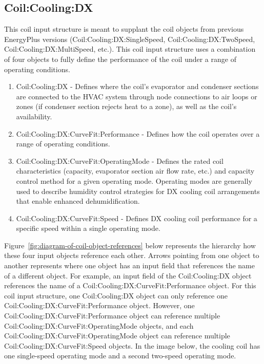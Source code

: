 \subsection{Coil:Cooling:DX}\label{coilcoolingdx}

This coil input structure is meant to supplant the coil objects from previous EnergyPlus versions (Coil:Cooling:DX:SingleSpeed, Coil:Cooling:DX:TwoSpeed, Coil:Cooling:DX:MultiSpeed, etc.). This coil input structure uses a combination of four objects to fully define the performance of the coil under a range of operating conditions.

\begin{enumerate}
\def\labelenumi{\arabic{enumi}.}
\item Coil:Cooling:DX - Defines where the coil's evaporator and condenser sections are connected to the HVAC system through node connections to air loops or zones (if condenser section rejects heat to a zone), as well as the coil's availability.

\item Coil:Cooling:DX:CurveFit:Performance - Defines how the coil operates over a range of operating conditions.

\item Coil:Cooling:DX:CurveFit:OperatingMode - Defines the rated coil characteristics (capacity, evaporator section air flow rate, etc.) and capacity control method for a given operating mode. Operating modes are generally used to describe humidity control strategies for DX cooling coil arrangements that enable enhanced dehumidification.

\item Coil:Cooling:DX:CurveFit:Speed - Defines DX cooling coil performance for a specific speed within a single operating mode.
\end{enumerate}

Figure~\ref{fig:diagram-of-coil-object-references} below represents the hierarchy how these four input objects reference each other. Arrows pointing from one object to another represents where one object has an input field that references the name of a different object. For example, an input field of the Coil:Cooling:DX object references the name of a Coil:Cooling:DX:CurveFit:Performance object. For this coil input structure, one Coil:Cooling:DX object can only reference one Coil:Cooling:DX:CurveFit:Performance object. However, one Coil:Cooling:DX:CurveFit:Performance object can reference multiple Coil:Cooling:DX:CurveFit:OperatingMode objects, and each Coil:Cooling:DX:CurveFit:OperatingMode object can reference multiple Coil:Cooling:DX:CurveFit:Speed objects. In the image below, the cooling coil has one single-speed operating mode and a second two-speed operating mode.

